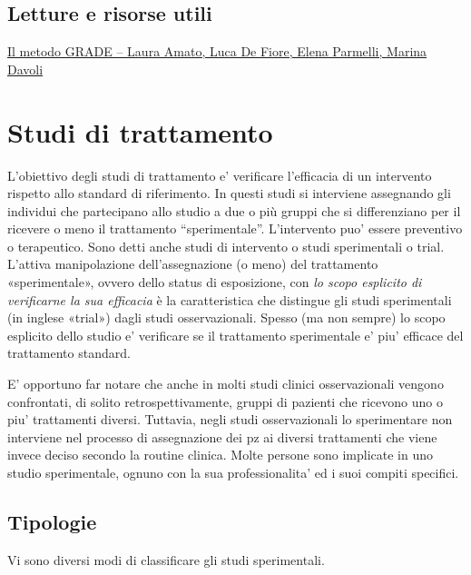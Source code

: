 \documentclass[]{book}
\begin{document}
\hypertarget{letture-e-risorse-utili}{%
\section{Letture e risorse utili}\label{letture-e-risorse-utili}}

\href{https://bal.lazio.it/wp-content/uploads/2017/05/Il-metodo-GRADE.pdf}{Il metodo GRADE -- Laura Amato, Luca De Fiore, Elena Parmelli, Marina Davoli}

\hypertarget{studi-di-trattamento}{%
\chapter{Studi di trattamento}\label{studi-di-trattamento}}

L'obiettivo degli studi di trattamento e' verificare l'efficacia di un intervento rispetto allo standard di riferimento. In questi studi si interviene assegnando gli individui che partecipano allo studio a due o più gruppi che si differenziano per il ricevere o meno il trattamento ``sperimentale''. L'intervento puo' essere preventivo o terapeutico. Sono detti anche studi di intervento o studi sperimentali o trial.
L'attiva manipolazione dell'assegnazione (o meno) del trattamento «sperimentale», ovvero dello status di esposizione, con \emph{lo scopo esplicito di verificarne la sua efficacia} è la caratteristica che distingue gli studi sperimentali (in inglese «trial») dagli studi osservazionali. Spesso (ma non sempre) lo scopo esplicito dello studio e' verificare se il trattamento sperimentale e' piu' efficace del trattamento standard.

E' opportuno far notare che anche in molti studi clinici osservazionali vengono confrontati, di solito retrospettivamente, gruppi di pazienti che ricevono uno o piu' trattamenti diversi. Tuttavia, negli studi osservazionali lo sperimentare non interviene nel processo di assegnazione dei pz ai diversi trattamenti che viene invece deciso secondo la routine clinica.
Molte persone sono implicate in uno studio sperimentale, ognuno con la sua professionalita' ed i suoi compiti specifici.

\hypertarget{tipologie}{%
\section{Tipologie}\label{tipologie}}

Vi sono diversi modi di classificare gli studi sperimentali.
\end{document}
